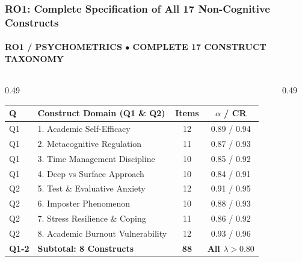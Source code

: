 \documentclass[aspectratio=169, 10pt]{beamer}
\begin{document}
\begin{frame}
  \frametitle{RO1: Complete Specification of All 17 Non-Cognitive Constructs}
  \framesubtitle{RO1 / PSYCHOMETRICS $\bullet$ COMPLETE 17 CONSTRUCT TAXONOMY}

  \begin{columns}[T]
    \begin{column}{0.49\textwidth}
      \begin{tcolorbox}[colback=white, colframe=BlueDeep, arc=1.5mm, boxrule=0.8pt, top=0.5mm, bottom=0.5mm, left=1mm, right=1mm]
        \centering\fontsize{6.2pt}{7.5pt}\selectfont
        \begin{tabularx}{\textwidth}{llcc}
          \toprule
          \textbf{Q} & \textbf{Construct Domain (Q1 \& Q2)} & \textbf{Items} & \textbf{$\alpha$ / CR} \\
          \midrule
          \rowcolor{BlueLight} Q1 & 1. Academic Self-Efficacy & 12 & 0.89 / 0.94 \\
          \rowcolor{BlueLight} Q1 & 2. Metacognitive Regulation & 11 & 0.87 / 0.93 \\
          \rowcolor{BlueLight} Q1 & 3. Time Management Discipline & 10 & 0.85 / 0.92 \\
          \rowcolor{BlueLight} Q1 & 4. Deep vs Surface Approach & 10 & 0.84 / 0.91 \\
          \midrule
          \rowcolor{CanvasBG} Q2 & 5. Test \& Evaluative Anxiety & 12 & 0.91 / 0.95 \\
          \rowcolor{CanvasBG} Q2 & 6. Imposter Phenomenon & 10 & 0.88 / 0.93 \\
          \rowcolor{CanvasBG} Q2 & 7. Stress Resilience \& Coping & 11 & 0.86 / 0.92 \\
          \rowcolor{CanvasBG} Q2 & 8. Academic Burnout Vulnerability & 12 & 0.93 / 0.96 \\
          \midrule
          \textbf{Q1-2} & \textbf{Subtotal: 8 Constructs} & \textbf{88} & \textbf{All $\lambda > 0.80$} \\
          \bottomrule
        \end{tabularx}
      \end{tcolorbox}
    \end{column}
    \begin{column}{0.49\textwidth}
      \begin{tcolorbox}[colback=white, colframe=BluePrimary, arc=1.5mm, boxrule=0.8pt, top=0.5mm, bottom=0.5mm, left=1mm, right=1mm]

\end{tcolorbox}
\end{column}
\end{columns}
\end{frame}
\end{document}

